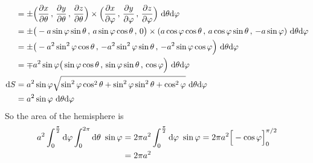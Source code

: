 \begin{eg}
\begin{align*}
&=\pm\Big(\frac{\partial x}{\partial\theta}\,,\,
          \frac{\partial y}{\partial\theta}\,,\,
          \frac{\partial z}{\partial\theta}\Big)
\times
\Big(\frac{\partial x}{\partial\varphi}\,,\,\frac{\partial y}{\partial\varphi}
   \,,\, \frac{\partial z}{\partial\varphi}\Big)
\ \mathrm{d}\theta\mathrm{d}\varphi\\
&=\pm \big(-a\sin\varphi\sin\theta\,,\,
       a\sin\varphi\cos\theta\,,\,0\big)
\times
(a\cos\varphi\cos\theta\,,\,a\cos\varphi\sin\theta\,,\,-a\sin\varphi)
\ \mathrm{d}\theta\mathrm{d}\varphi\\
&=\pm\big(-a^2\sin^2\varphi\cos\theta\,,\,
          -a^2\sin^2\varphi\sin\theta\,,\,
          -a^2\sin\varphi\cos\varphi\Big)\ \mathrm{d}\theta\mathrm{d}\varphi \\
&=\mp a^2\sin\varphi \big(\sin\varphi\cos\theta\,,\,
          \sin\varphi\sin\theta\,,\,
          \cos\varphi\Big)\ \mathrm{d}\theta\mathrm{d}\varphi \\
\mathrm{d}S&=a^2\sin\varphi \sqrt{\sin^2\varphi\cos^2\theta
                    +\sin^2\varphi\sin^2\theta
                    +\cos^2\varphi}\ \mathrm{d}\theta\mathrm{d}\varphi\\
        &=a^2\sin\varphi\ \mathrm{d}\theta\mathrm{d}\varphi
\end{align*}
So the area of the hemisphere is
\begin{align*}
a^2\int_0^{\frac{\pi}{2}} \dee{\varphi }\int_0^{2\pi}\dee{\theta}\ \sin\varphi
&=2\pi a^2 \int_0^{\frac{\pi}{2}} \dee{\varphi }\ \sin\varphi
=2\pi a^2\Big[-\cos\varphi\Big]_0^{\pi/2} \\
&=2\pi a^2
\end{align*}
\end{eg}

